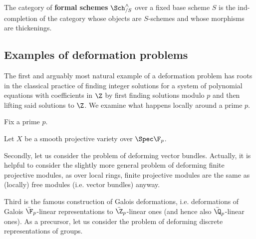         \begin{definition} \label{def: formal_schemes}
            The category of \textbf{formal schemes} $\Sch_{/S}^{\wedge}$ over a fixed base scheme $S$ is the ind-completion of the category whose objects are $S$-schemes and whose morphisms are thickenings.
        \end{definition}
        \begin{definition} \label{def: versal_miniversal_and_universal_deformations}
            
        \end{definition}

    \subsection{Examples of deformation problems}
        The first and arguably most natural example of a deformation problem has roots in the classical practice of finding integer solutions for a system of polynomial equations with coefficients in $\Z$ by first finding solutions modulo $p$ and then lifting said solutions to $\Z$. We examine what happens locally around a prime $p$.
        \begin{example}
            Fix a prime $p$.
        
            Let $X$ be a smooth projective variety over $\Spec \F_p$.  
        \end{example}

        Secondly, let us consider the problem of deforming vector bundles. Actually, it is helpful to consider the slightly more general problem of deforming finite projective modules, as over local rings, finite projective modules are the same as (locally) free modules (i.e. vector bundles) anyway.
        \begin{example}
            
        \end{example}

        Third is the famous construction of Galois deformations, i.e. deformations of Galois $\bar{\F}_p$-linear representations to $\bar{\Z}_p$-linear ones (and hence also $\bar{\Q}_p$-linear ones). As a precursor, let us consider the problem of deforming discrete representations of groups.
        \begin{example}
            
        \end{example}
        \begin{example}
            
        \end{example}

